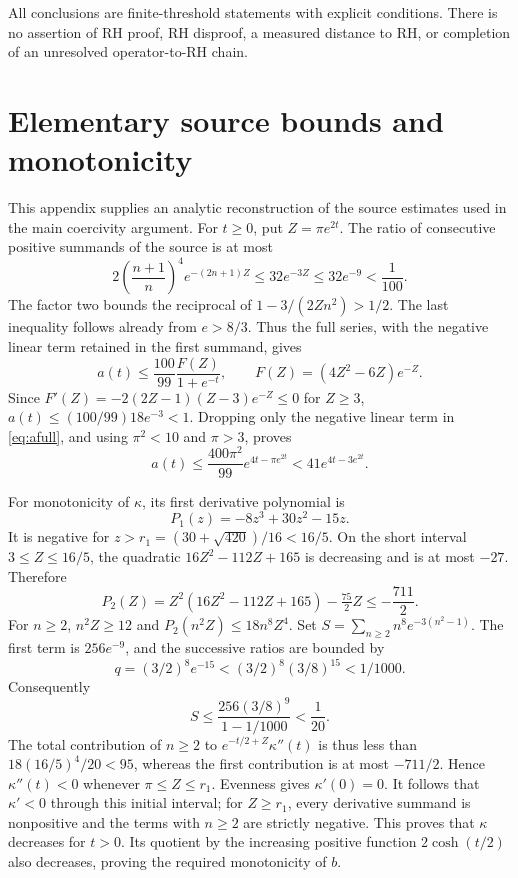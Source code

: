\documentclass[11pt,a4paper]{article}
\numberwithin{equation}{section}
\theoremstyle{definition}\newtheorem{definition}[theorem]{Definition}
\theoremstyle{remark}\newtheorem{remark}[theorem]{Remark}
\begin{document}
All conclusions are finite-threshold statements with explicit conditions. There is no assertion of RH proof, RH disproof, a measured distance to RH, or completion of an unresolved operator-to-RH chain.

\appendix
\section{Elementary source bounds and monotonicity}\label{app:source}
This appendix supplies an analytic reconstruction of the source estimates used in the main coercivity argument. For $t\ge0$, put $Z=\pi e^{2t}$. The ratio of consecutive positive summands of the source is at most
\begin{equation}\label{eq:thetaratio}
 2\left(\frac{n+1}{n}\right)^4e^{-(2n+1)Z}
 \le32e^{-3Z}\le32e^{-9}<\frac1{100}.
\end{equation}
The factor two bounds the reciprocal of $1-3/(2Zn^2)>1/2$. The last inequality follows already from $e>8/3$. Thus the full series, with the negative linear term retained in the first summand, gives
\begin{equation}\label{eq:afull}
 a(t)\le\frac{100}{99}\frac{F(Z)}{1+e^{-t}},
 \qquad F(Z)=(4Z^2-6Z)e^{-Z}.
\end{equation}
Since $F'(Z)=-2(2Z-1)(Z-3)e^{-Z}\le0$ for $Z\ge3$,
$a(t)\le(100/99)18e^{-3}<1$. Dropping only the negative linear term in \eqref{eq:afull}, and using $\pi^2<10$ and $\pi>3$, proves
\begin{equation}
 a(t)\le\frac{400\pi^2}{99}e^{4t-\pi e^{2t}}
 <41e^{4t-3e^{2t}}.
\end{equation}

For monotonicity of $\kappa$, its first derivative polynomial is
\[
 P_1(z)=-8z^3+30z^2-15z.
\]
It is negative for $z>r_1=(30+\sqrt{420})/16<16/5$. On the short interval $3\le Z\le16/5$, the quadratic $16Z^2-112Z+165$ is decreasing and is at most $-27$. Therefore
\begin{equation}\label{eq:P2negative}
 P_2(Z)=Z^2(16Z^2-112Z+165)-\tfrac{75}{2}Z
 \le-\frac{711}{2}.
\end{equation}
For $n\ge2$, $n^2Z\ge12$ and
$P_2(n^2Z)\le18n^8Z^4$. Set
$S=\sum_{n\ge2}n^8e^{-3(n^2-1)}$. The first term is $256e^{-9}$, and the successive ratios are bounded by
\[
 q=(3/2)^8e^{-15}<(3/2)^8(3/8)^{15}<1/1000.
\]
Consequently
\begin{equation}\label{eq:Sbound}
 S\le\frac{256(3/8)^9}{1-1/1000}<\frac1{20}.
\end{equation}
The total contribution of $n\ge2$ to $e^{-t/2+Z}\kappa''(t)$ is thus less than $18(16/5)^4/20<95$, whereas the first contribution is at most $-711/2$. Hence $\kappa''(t)<0$ whenever $\pi\le Z\le r_1$. Evenness gives $\kappa'(0)=0$. It follows that $\kappa'<0$ through this initial interval; for $Z\ge r_1$, every derivative summand is nonpositive and the terms with $n\ge2$ are strictly negative. This proves that $\kappa$ decreases for $t>0$. Its quotient by the increasing positive function $2\cosh(t/2)$ also decreases, proving the required monotonicity of $b$.
\end{document}

